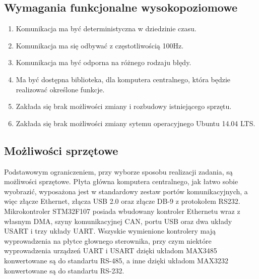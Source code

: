 \documentclass[10pt,a4paper]{article}
\begin{document}
	\subsection{Wymagania funkcjonalne wysokopoziomowe}
	\begin{enumerate}
		\item Komunikacja ma być deterministyczna w dziedzinie czasu.
		\item Komunikacja ma się odbywać z częstotliwością 100Hz.
		\item Komunikacja ma być odporna na różnego rodzaju błędy.
		\item Ma być dostępna biblioteka, dla komputera centralnego, która będzie realizować określone funkcje.
		\item Zakłada się brak możliwości zmiany i rozbudowy istniejącego sprzętu.
		\item Zakłada się brak możliwości zmiany sytemu operacyjnego Ubuntu 14.04 LTS.
	\end{enumerate}
	\subsection{Możliwości sprzętowe}
	Podstawowym ograniczeniem, przy wyborze sposobu realizacji zadania, są możliwości sprzętowe. Płyta główna komputera centralnego, jak łatwo sobie wyobrazić, wyposażona jest w standardowy zestaw portów komunikacyjnych, a więc złącze Ethernet, złącza USB 2.0 oraz złącze DB-9 z protokołem RS232. Mikrokontroler STM32F107 posiada wbudowany kontroler Ethernetu wraz z własnym DMA, szyny komunikacyjnej CAN, portu USB oraz dwa układy USART i trzy układy UART. Wszyskie wymienione kontrolery mają wyprowadzenia na płytce głownego sterownika, przy czym niektóre wyprowadzenia urządzeń UART i USART dzięki układom MAX3485 konwertowane są do standartu RS-485, a inne dzięki układom MAX3232 konwertowane są do standartu RS-232.
\end{document}
